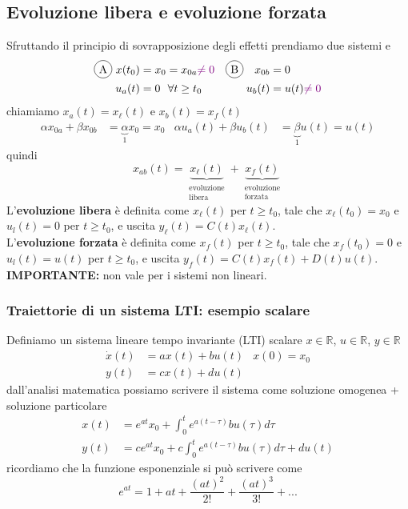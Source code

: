 \documentclass{article}
\numberwithin{equation}{subsection}
\let\oldsubsection\subsection%
\renewcommand{\subsection}{%
  \renewcommand{\theequation}{\thesubsection.\arabic{equation}}%
  \oldsubsection}%
\begin{document}
\subsection{Evoluzione libera e evoluzione forzata}
Sfruttando il principio di sovrapposizione degli effetti prendiamo due sistemi  e  
\begin{align*}
   \circled{A} \ x(t_0) &= x_0 =x_{0a} {\color{violet} \neq 0} & \circled{B} \ \ \ x_{0b}&=0\\
    u_a(t) &= 0 \ \ \forall t \geq t_0 & u_b(t) &= u(t) {\color{violet}\neq 0}
\end{align*}
chiamiamo $x_a(t)=x_\ell(t)$ e $x_b(t) = x_f(t)$
\begin{align*}
    \alpha x_{0a} + \beta x_{0b} &= \underbrace{\alpha}_{1} x_0 = x_0 & 
    \alpha u_a(t) + \beta u_b(t) &= \underbrace{\beta}_{1}u(t) = u(t)
\end{align*}
quindi
\begin{equation}
    x_{ab}(t) = \underbrace{x_\ell(t)}_{\substack{\text{evoluzione} \\ \text{libera}}} + \underbrace{x_f(t)}_{\substack{\text{evoluzione} \\ \text{forzata}}}
\end{equation}
L'\textbf{evoluzione libera} è definita come $x_\ell(t)$ per $t \geq t_0$, tale che $x_\ell (t_0)=x_0$ e $u_l(t)=0$ per $t \geq t_0$, e uscita $y_\ell(t)=C(t)x_\ell(t)$.\\
L'\textbf{evoluzione forzata} è definita come $x_f(t)$ per $t \geq t_0$, tale che $x_f (t_0)=0$ e $u_l(t)=u(t)$ per $t \geq t_0$, e uscita $y_f(t)=C(t)x_f(t)+D(t)u(t)$.
\vspace*{0.2cm}\\
\textbf{IMPORTANTE:} non vale per i sistemi non lineari.


\subsubsection{Traiettorie di un sistema LTI: esempio scalare}
Definiamo un sistema lineare tempo invariante (LTI) scalare $x \in \mathbb{R}$, $u \in \mathbb{R}$, $y \in \mathbb{R}$
\begin{align*}
    \dot x(t) &= ax(t) + bu(t) &x(0) = x_0\\
    y(t) &= cx(t) + du(t)
\end{align*}
dall'analisi matematica possiamo scrivere il sistema come soluzione omogenea + soluzione particolare
\begin{align*}
    x(t) &= e^{at}x_0 + \int_0^t e^{a(t-\tau)}bu(\tau) d \tau \\
    y(t) &= ce^{at}x_0 + c \int_0^t e^{a(t-\tau)}bu(\tau) d \tau + du(t)
\end{align*}
ricordiamo che la funzione esponenziale si può scrivere come
\begin{equation}
    e^{at} = 1 + at + \frac{(at)^2}{2!} + \frac{(at)^3}{3!} + ...
\end{equation}
\end{document}

